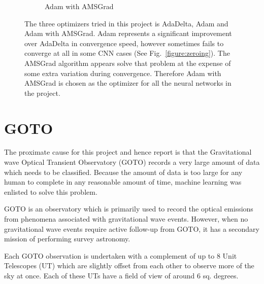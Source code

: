 \documentclass[a4paper,fleqn,usenatbib]{mnras}
\begin{document}
\begin{figure}
\begin{subfigure}{0.666\columnwidth}
 \caption{Adam with AMSGrad}
 \label{fig:AdamAMSGrad}
 \end{subfigure}

 \caption{The three optimizers tried in this project is AdaDelta, Adam and Adam with AMSGrad. Adam represents a significant improvement over AdaDelta in convergence speed, however sometimes fails to converge at all in some CNN cases (See Fig.~\ref{figure:zeroing}). The AMSGrad algorithm appears solve that problem at the expense of some extra variation during convergence. Therefore Adam with AMSGrad is chosen as the optimizer for all the neural networks in the project.}
 \label{fig:Optimizers}
 \end{figure}

\section{GOTO}
The proximate cause for this project and hence report is that the Gravitational wave Optical Transient Observatory (GOTO) records a very large amount of data which needs to be classified. Because the amount of data is too large for any human to complete in any reasonable amount of time, machine learning was enlisted to solve this problem. \citep{GOTO}

GOTO is an observatory which is primarily used to record the optical emissions from phenomena associated with gravitational wave events. However, when no gravitational wave events require active follow-up from GOTO, it has a secondary mission of performing survey astronomy. 

Each GOTO observation is undertaken with a complement of up to 8 Unit Telescopes (UT) which are slightly offset from each other to observe more of the sky at once. Each of these UTs have a field of view of around 6 sq. degrees. 
\end{document}
